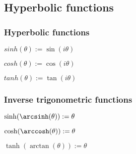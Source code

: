 
\subsection{Hyperbolic functions}

\subsubsection{Hyperbolic functions}

$sinh(\theta ):=\sin(i\theta )$

$cosh(\theta ):=\cos(i\theta )$

$tanh(\theta ):=\tan(i\theta )$

\subsubsection{Inverse trigonometric functions}

$\sinh (\arcsinh (\theta )):=\theta $

$\cosh (\arccosh (\theta )):=\theta $

$\tanh (\arctan (\theta )):=\theta $

